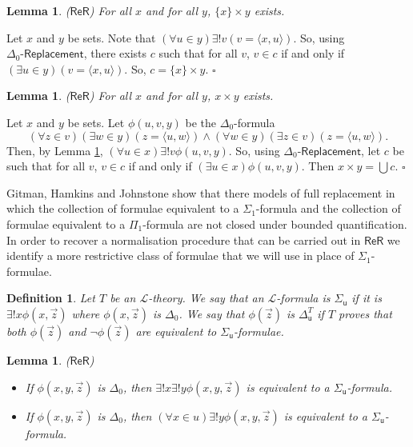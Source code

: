 \documentclass[11pt, a4paper]{article}
\newcounter{Def1}
\newtheorem{definition}[theorem]{Definition}
\newtheorem{lemma}[theorem]{Lemma}
\newenvironment{proof}[1][Proof]{\begin{trivlist}
\item[\hskip \labelsep {\bfseries #1}]}{\end{trivlist}}
\begin{document}
\begin{lemma} \label{Th:CartesianProductOfSingleton}
($\mathsf{ReR}$) For all $x$ and for all $y$, $\{x\} \times y$ exists.  
\end{lemma}

\begin{proof}
Let $x$ and $y$ be sets. Note that $(\forall u \in y) \exists! v(v= \langle x, u \rangle)$. So, using $\Delta_0\textsf{-Replacement}$, there exists $c$ such that for all $v$, $v \in c$ if and only if $(\exists u \in y)(v= \langle x, u\rangle)$.  So, $c= \{x\} \times y$. \hfill$\square$
\end{proof}

\begin{lemma} \label{Th:CartesianProduct}
($\mathsf{ReR}$) For all $x$ and for all $y$, $x \times y$ exists.
\end{lemma}

\begin{proof}
Let $x$ and $y$ be sets. Let $\phi(u, v, y)$ be the $\Delta_0$-formula
\[
(\forall z \in v)(\exists w \in y)(z=\langle u, w\rangle) \land (\forall w \in y)(\exists z \in v)(z= \langle u, w \rangle). 
\]
Then, by Lemma \ref{Th:CartesianProductOfSingleton}, $(\forall u \in x) \exists! v \phi(u, v, y)$. So, using $\Delta_0\textsf{-Replacement}$, let $c$ be such that for all $v$, $v \in c$ if and only if $(\exists u \in x)\phi(u, v, y)$. Then $x \times y= \bigcup c$. \hfill$\square$  
\end{proof} 

Gitman, Hamkins and Johnstone \cite{ghj16} show that there models of full replacement in which the collection of formulae equivalent to a $\Sigma_1$-formula and the collection of formulae equivalent to a $\Pi_1$-formula are not closed under bounded quantification. In order to recover a normalisation procedure that can be carried out in $\mathsf{ReR}$ we identify a more restrictive class of formulae that we will use in place of $\Sigma_1$-formulae.

\begin{definition}
Let $T$ be an $\mathcal{L}$-theory. We say that an $\mathcal{L}$-formula is $\Sigma_{\mathsf{u}}$ if it is $\exists ! x \phi(x, \vec{z})$ where $\phi(x, \vec{z})$ is $\Delta_0$. We say that $\phi(\vec{z})$ is $\Delta_{\mathsf{u}}^T$ if $T$ proves that both $\phi(\vec{z})$ and $\neg \phi(\vec{z})$ are equivalent to $\Sigma_{\mathsf{u}}$-formulae. 
\end{definition}

\begin{lemma} \label{Th:UniqueSigmaNormalisation}
($\mathsf{ReR}$)
\begin{itemize}
\item[(I)] If $\phi(x, y, \vec{z})$ is $\Delta_0$, then $\exists! x \exists! y \phi(x, y, \vec{z})$ is equivalent to a $\Sigma_{\mathsf{u}}$-formula.
\item[(II)] If $\phi(x, y, \vec{z})$ is $\Delta_0$, then $(\forall x \in u) \exists! y \phi(x, y, \vec{z})$ is equivalent to a $\Sigma_{\mathsf{u}}$-formula.
\end{itemize}
\end{lemma}
\end{document}
